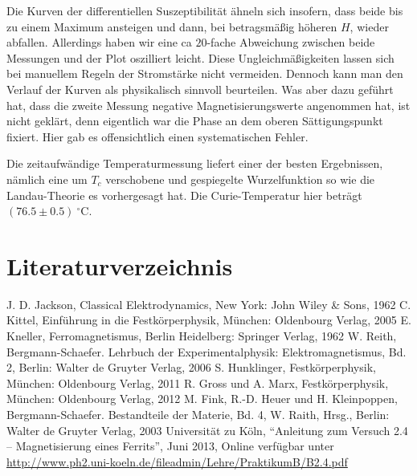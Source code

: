 \documentclass[12pt,a4paper]{scrartcl}
\numberwithin{equation}{section} %
\renewcommand{\[}{} %
\renewcommand{\]}{\noindent} %
\begin{document}
Die Kurven der differentiellen Suszeptibilität ähneln sich insofern, dass beide bis zu einem Maximum ansteigen und dann, bei betragsmäßig höheren \(H\), wieder abfallen. Allerdings haben wir eine ca \(20\)-fache Abweichung zwischen beide Messungen und der Plot oszilliert leicht. Diese Ungleichmäßigkeiten lassen sich bei manuellem Regeln der Stromstärke nicht vermeiden. Dennoch kann man den Verlauf der Kurven als physikalisch sinnvoll beurteilen. Was aber dazu geführt hat, dass die zweite Messung negative Magnetisierungswerte angenommen hat, ist nicht geklärt, denn eigentlich war die Phase an dem oberen Sättigungspunkt fixiert. Hier gab es offensichtlich einen systematischen Fehler.

Die zeitaufwändige Temperaturmessung liefert einer der besten Ergebnissen, nämlich eine um \(T_{c}\) verschobene und gespiegelte Wurzelfunktion so wie die Landau-Theorie es vorhergesagt hat. Die Curie-Temperatur hier beträgt \((76.5 \pm 0.5) \ ^\circ\mathrm C\).

\clearpage
\hypertarget{literaturverzeichnis}{%
\section{Literaturverzeichnis}\label{literaturverzeichnis}}
\begin{thebibliography}{9}
J. D. Jackson, Classical Elektrodynamics, New York: John Wiley \& Sons, 1962
		C. Kittel, Einführung in die Festkörperphysik, München: Oldenbourg Verlag, 2005
		E. Kneller, Ferromagnetismus, Berlin Heidelberg: Springer Verlag, 1962
		W. Reith, Bergmann-Schaefer. Lehrbuch der Experimentalphysik: Elektromagnetismus, Bd. 2, Berlin: Walter de Gruyter Verlag, 2006
		S. Hunklinger, Festkörperphysik, München: Oldenbourg Verlag, 2011
		R. Gross und A. Marx, Festkörperphysik, München: Oldenbourg Verlag, 2012
		M. Fink, R.-D. Heuer und H. Kleinpoppen, Bergmann-Schaefer. Bestandteile der Materie, Bd. 4, W. Raith, Hrsg., Berlin: Walter de Gruyter Verlag, 2003
		Universität zu Köln, ``Anleitung zum Versuch 2.4 -- Magnetisierung eines Ferrits'', Juni 2013, Online verfügbar unter \url{http://www.ph2.uni-koeln.de/fileadmin/Lehre/PraktikumB/B2.4.pdf}
\end{thebibliography}
\end{document}
